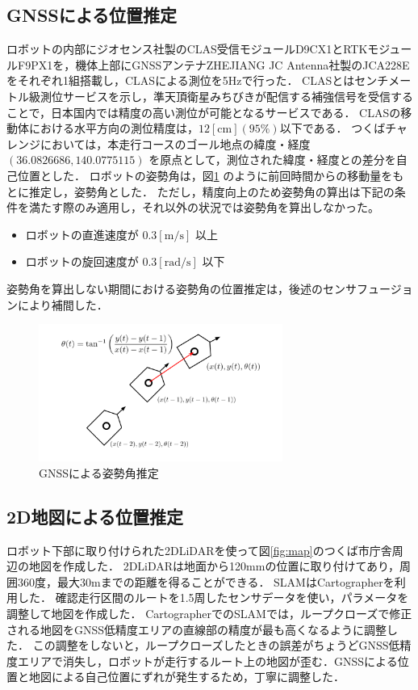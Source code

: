 \documentclass[platex,dvipdfmx]{rbproceedings}
\begin{document}
\subsection{GNSSによる位置推定}\label{ss:gnss_localization}
ロボットの内部にジオセンス社製のCLAS受信モジュールD9CX1とRTKモジュールF9PX1を，機体上部にGNSSアンテナZHEJIANG JC Antenna社製のJCA228Eをそれぞれ1組搭載し，CLASによる測位を5Hzで行った．
CLASとはセンチメートル級測位サービスを示し，準天頂衛星みちびきが配信する補強信号を受信することで，日本国内では精度の高い測位が可能となるサービスである．
CLASの移動体における水平方向の測位精度は，$12[\mathrm{cm}] (95 \%)$以下である．
つくばチャレンジにおいては，本走行コースのゴール地点の緯度・経度 $(36.0826686 ,140.0775115)$ を原点として，測位された緯度・経度との差分を自己位置とした．
ロボットの姿勢角は，図\ref{fig:gnss_orientaiton} のように前回時間からの移動量をもとに推定し，姿勢角とした．
ただし，精度向上のため姿勢角の算出は下記の条件を満たす際のみ適用し，それ以外の状況では姿勢角を算出しなかった。
\begin{itemize}
    \item ロボットの直進速度が $0.3[\mathrm{m/s}]$ 以上
    \item ロボットの旋回速度が $0.3[\mathrm{rad/s}]$ 以下
\end{itemize}
姿勢角を算出しない期間における姿勢角の位置推定は，後述のセンサフュージョンにより補間した．



\begin{figure}[htbp]
    \centering   
    \includegraphics[keepaspectratio,width=80mm]{fig/gnss_orientation.png}
    \caption{GNSSによる姿勢角推定}
    \label{fig:gnss_orientaiton}
\end{figure}

\subsection{2D地図による位置推定}\label{ss:map_localization}
ロボット下部に取り付けられた2DLiDARを使って図\ref{fig:map}のつくば市庁舎周辺の地図を作成した．
2DLiDARは地面から120mmの位置に取り付けてあり，周囲360度，最大30mまでの距離を得ることができる．
SLAMはCartographer\cite{cartographer}を利用した．
確認走行区間のルートを1.5周したセンサデータを使い，パラメータを調整して地図を作成した．
CartographerでのSLAMでは，ループクローズで修正される地図をGNSS低精度エリアの直線部の精度が最も高くなるように調整した．
この調整をしないと，ループクローズしたときの誤差がちょうどGNSS低精度エリアで消失し，ロボットが走行するルート上の地図が歪む．GNSSによる位置と地図による自己位置にずれが発生するため，丁寧に調整した．
\end{document}
